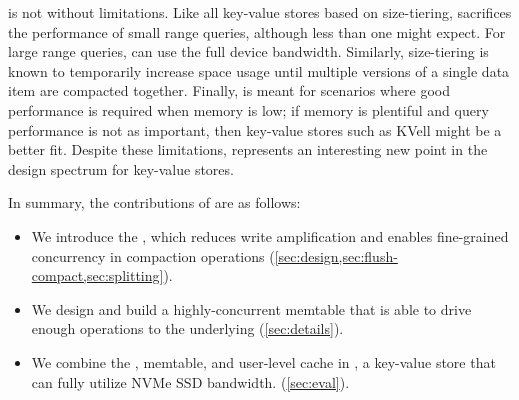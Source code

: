 %

\sysname is not without limitations. Like all key-value stores based
on size-tiering, \sysname sacrifices the performance of small range
queries, although less than one might expect.  For large range
queries, \sysname can use the full device bandwidth. Similarly,
size-tiering is known to temporarily increase space usage until
multiple versions of a single data item are compacted
together. Finally, \sysname is meant for scenarios where good
performance is required when memory is low; if memory is plentiful
and query performance is not as important,
then key-value stores such as KVell might be a better fit. Despite
these limitations, \sysname represents an interesting new point in the
design spectrum for key-value stores.

In summary, the contributions of \sysname are as follows:
\begin{itemize}
   \item We introduce the \datastruct, which reduces write amplification and
      enables fine-grained concurrency in compaction operations
      (\cref{sec:design,sec:flush-compact,sec:splitting}).
   \item We design and build a highly-concurrent memtable that is able to drive
      enough operations to the underlying \datastruct (\cref{sec:details}).
   \item We combine the \datastruct, memtable, and user-level cache in
      \sysname, a key-value store that can fully utilize NVMe SSD bandwidth.
      (\cref{sec:eval}).
\end{itemize}
